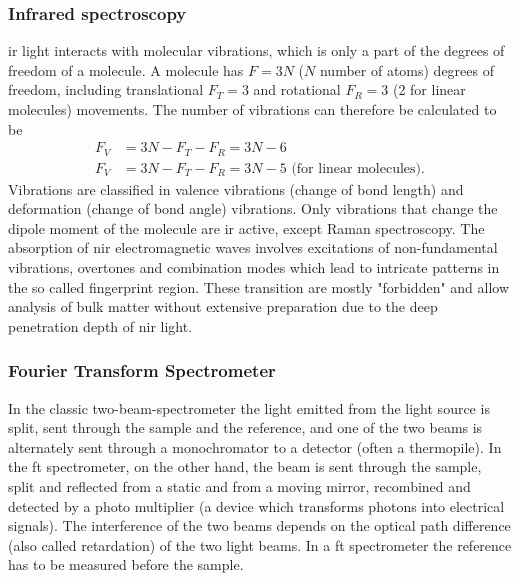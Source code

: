 \subsubsection{Infrared spectroscopy}
\Gls{ir} light interacts with molecular vibrations, which is only a part of the degrees of freedom of a molecule.
A molecule has $F=3N$ ($N$ number of atoms) degrees of freedom, including translational $F_T=3$ and rotational $F_R=3$ (2 for linear molecules) movements. 
%
The number of vibrations can therefore be calculated to be
\begin{align*}
	F_V &= 3N - F_T - F_R = 3N - 6 \\
	F_V &= 3N - F_T - F_R = 3N - 5 \textrm{ (for linear molecules)}.
\end{align*}
Vibrations are classified in valence vibrations (change of bond length) and deformation (change of bond angle) vibrations\cite{Melker2006}. 
Only vibrations that change the dipole moment of the molecule are \gls{ir} active, except Raman spectroscopy. 
The absorption of \Gls{nir} electromagnetic waves involves excitations of non-fundamental vibrations, overtones and combination modes which lead to intricate patterns in the so called fingerprint region. 
These transition are mostly "forbidden" and allow analysis of bulk matter without extensive preparation
due to the deep penetration depth of \gls{nir} light\cite{bec2019breakthrough}.
\fi

\subsubsection{Fourier Transform Spectrometer}
In the classic two-beam-spectrometer the light emitted from the light source is split, 
sent through the sample and the reference, and one of the two beams is alternately 
sent through a monochromator to a detector (often a thermopile).
%
In the \gls{ft} spectrometer, on the other hand, the beam is sent through the sample, split and 
reflected from a static and from a moving mirror, recombined and detected by a photo 
multiplier (a device which transforms photons into electrical signals). 
The interference of the two beams 
depends on the optical path difference (also called retardation) of the two light beams\cite{Schwedt2008}.
In a \gls{ft} spectrometer the reference has to be measured before the sample.

